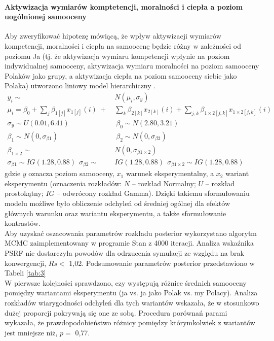 \documentclass[man]{apa6}
\begin{document}
\paragraph{Aktywizacja wymiarów komptetencji, moralności i ciepła a poziom uogólnionej samooceny}
Aby zweryfikować hipotezę mówiącą, że wpływ aktywizacji wymiarów kompetencji, moralności i ciepła na samoocenę będzie różny w zależności od poziomu Ja (tj. że aktywizacja wymiaru kompetencji wpłynie na poziom indywidualnej samooceny, aktywizacja wymiaru moralności na poziom samooceny Polaków jako grupy, a aktywizacja ciepła na poziom samooceny siebie jako Polaka) utworzono liniowy model hierarchiczny \parencite[jako odpowiednik klasycznej dwuczynnikowej analizy wariancji, za:,][]{kruschke2014doing}.
\begin{equation}\label{eq:4}
\begin{split}
y_i  \sim\ & N(\mu_i, \sigma_y) \\
\mu_i  = \beta_0 + \sum_j\beta_{1[j]}x_{1[j]}(i)\ +\ &\sum_k\beta_{2[k]}x_{2[k]}(i)+\sum_{j,k}\beta_{1\times2[j,k]}x_{1\times2[j,k]}(i) \\
\sigma_y \sim U(0.01,6.41)\ &\ \beta_0 \sim N(2.80, 3.21) \\
\beta_1 \sim N(0, \sigma_{\beta1})\ &\ \beta_2 \sim N(0, \sigma_{\beta2}) \\
\beta_{1\times2} \sim\ & N(0, \sigma_{\beta1\times2}) \\
\sigma_{\beta1} \sim IG(1.28,0.88)\ \ \sigma_{\beta2} \sim\ & IG(1.28,0.88)\ \ \sigma_{\beta1\times2} \sim IG(1.28,0.88)
\end{split}
\end{equation}
gdzie $y$ oznacza poziom samooceny, $x_1$ warunek eksperymentalny, a $x_2$ wariant eksperymentu (oznaczenia rozkładów: $N$ -- rozkład Normalny; $U$ -- rozkład prostokątny; $IG$ -- odwrócony rozkład Gamma). Dzięki takiemu sformułowaniu modelu możliwe było obliczenie odchyleń od średniej ogólnej dla efektów głównych warunku oraz wariantu eksperymentu, a także sformułowanie kontrastów. \\
Aby uzyskać oszacowania parametrów rozkładu posterior wykorzystano algorytm MCMC zaimplementowany w programie Stan \parencite{carpenter2016} z 4000 iteracji. Analiza wskaźnika PSRF nie dostarczyła powodów dla odrzucenia symulacji ze względu na brak konwergencji, $Rs <$ 1,02. Podsumowanie parametrów posterior przedstawiono w Tabeli \ref{tab:3} \\
W pierwsze kolejności sprawdzono, czy występują różnice średnich samooceny pomiędzy wariantami eksperymentu (ja vs. ja jako Polak vs. my Polacy). Analiza rozkładów wiarygodności odchyleń dla tych wariantów wskazała, że w stosunkowo dużej proporcji pokrywają się one ze sobą. Procedura porównań parami wykazała, że prawdopodobieństwo różnicy pomiędzy którymkolwiek z wariantów jest mniejsze niż, $p =$ 0,77. \\
\end{document}
